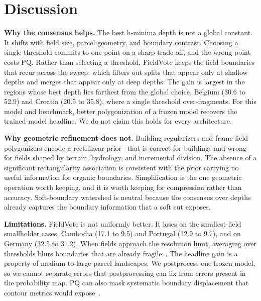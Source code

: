 \documentclass[conference]{IEEEtran}
\newcommand{\parhead}[1]{\smallskip\noindent\textbf{#1}\hspace{0.6em}}
\begin{document}
\section{Discussion}
\parhead{Why the consensus helps.}
The best h-minima depth is not a global constant. It shifts with field size, parcel geometry, and boundary contrast. Choosing a single threshold commits to one point on a sharp trade-off, and the wrong point costs PQ. Rather than selecting a threshold, FieldVote keeps the field boundaries that recur across the sweep, which filters out splits that appear only at shallow depths and merges that appear only at deep depths. The gain is largest in the regions whose best depth lies farthest from the global choice, Belgium (30.6 to 52.9) and Croatia (20.5 to 35.8), where a single threshold over-fragments. For this model and benchmark, better polygonization of a frozen model recovers the trained-model headline. We do not claim this holds for every architecture.

\parhead{Why geometric refinement does not.}
Building regularizers and frame-field polygonizers encode a rectilinear prior~\cite{girard2021framefield,zorzi2022polyworld,zorzi2020regularization} that is correct for buildings and wrong for fields shaped by terrain, hydrology, and incremental division. The absence of a significant rectangularity association is consistent with the prior carrying no useful information for organic boundaries. Simplification is the one geometric operation worth keeping, and it is worth keeping for compression rather than accuracy. Soft-boundary watershed is neutral because the consensus over depths already captures the boundary information that a soft cut exposes.

\parhead{Limitations.}
FieldVote is not uniformly better. It loses on the smallest-field smallholder cases, Cambodia (17.1 to 9.5) and Portugal (12.9 to 9.7), and on Germany (32.5 to 31.2). When fields approach the resolution limit, averaging over thresholds blurs boundaries that are already fragile~\cite{persello2023ai4smallfarms,dandrimont2023ai4boundaries}. The headline gain is a property of medium-to-large parcel landscapes. We postprocess one frozen model, so we cannot separate errors that postprocessing can fix from errors present in the probability map. PQ can also mask systematic boundary displacement that contour metrics would expose~\cite{avbelj2015polis}.
\end{document}
